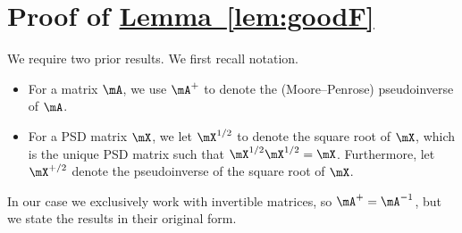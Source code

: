 \documentclass[11pt]{article}
\newcommand{\expref}[2]{\texorpdfstring{\hyperref[#2]{#1~\ref{#2}}}{#1~\ref{#2}}}
\begin{document}
\section{Proof of \expref{Lemma}{lem:goodF}}\label{sec:goodF}
We require two prior results. We first recall notation.
\begin{itemize}
    \item For a matrix $\mA$, we use $\mA^+$ to denote the (Moore--Penrose) %
    pseudoinverse of $\mA$.  %
    \item For a PSD matrix $\mX$, we let $\mX^{1/2}$ to denote the square root of $\mX$, which is the unique PSD matrix such that $\mX^{1/2}\mX^{1/2}=\mX$. Furthermore, let $\mX^{+/2}$ denote the pseudoinverse  %
    of the square root of $\mX$.
\end{itemize}
In our case we exclusively work with invertible matrices, so $\mA^+=\mA^{-1}$, but we
state the results in their original %
form.  %
  
\end{document}
